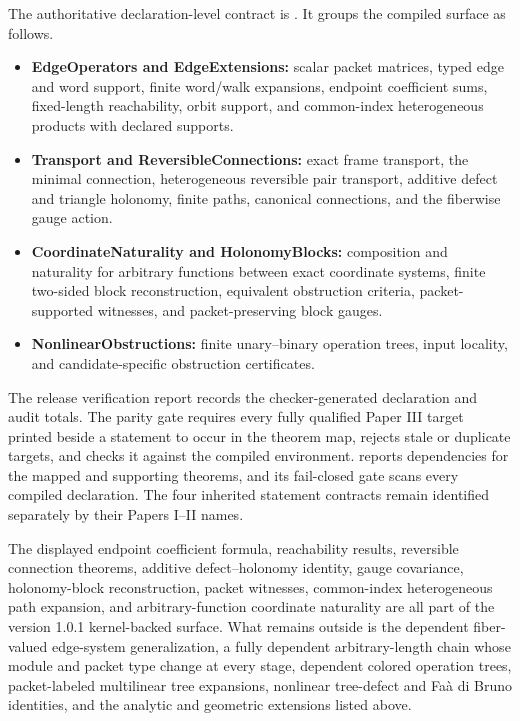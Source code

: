 The authoritative declaration-level contract is
.  It groups the compiled
surface as follows.
\begin{itemize}
\item \textbf{EdgeOperators and EdgeExtensions:} scalar packet matrices,
typed edge and word support, finite word/walk expansions, endpoint coefficient
sums, fixed-length reachability, orbit support, and common-index
heterogeneous products with declared supports.
\item \textbf{Transport and ReversibleConnections:} exact frame transport,
the minimal connection, heterogeneous reversible pair transport, additive
defect and triangle holonomy, finite paths, canonical connections, and the
fiberwise gauge action.
\item \textbf{CoordinateNaturality and HolonomyBlocks:} composition and
naturality for arbitrary functions between exact coordinate systems, finite
two-sided block reconstruction, equivalent obstruction criteria,
packet-supported witnesses, and packet-preserving block gauges.
\item \textbf{NonlinearObstructions:} finite unary--binary operation trees,
input locality, and candidate-specific obstruction certificates.
\end{itemize}
The release verification report records the checker-generated declaration
and audit totals.  The parity gate requires every fully qualified Paper III
target printed beside a statement to occur in the theorem map, rejects stale
or duplicate targets, and checks it against the compiled environment.
 reports dependencies for the mapped and supporting
theorems, and its fail-closed gate scans every compiled
 declaration.  The four inherited statement
contracts remain identified separately by their Papers I--II names.

\begin{boundary}
The displayed endpoint coefficient formula, reachability results, reversible
connection theorems, additive defect--holonomy identity, gauge covariance,
holonomy-block reconstruction, packet witnesses, common-index heterogeneous
path expansion, and arbitrary-function coordinate naturality are all part of
the version 1.0.1 kernel-backed surface.  What remains outside is the
dependent fiber-valued edge-system generalization, a fully dependent
arbitrary-length chain whose module and packet type change at every stage,
dependent colored operation trees, packet-labeled multilinear tree
expansions, nonlinear tree-defect and Fa\`a di Bruno identities, and the
analytic and geometric extensions listed above.
\end{boundary}

